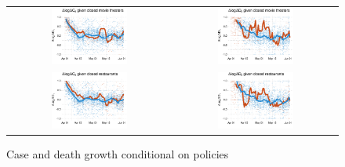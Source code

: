 \documentclass[11pt,reqno,letter]{amsart}
\theoremstyle{definition}
\begin{document}
\begin{figure}
  \caption{Case and death growth conditional on policies \label{fig:growthpolicies2}}
  \begin{minipage}{\linewidth}
    \centering
    \begin{tabular}{cc}
      \includegraphics[width=0.483\textwidth]{tables_and_figures/pmovie-cases-14}
      &
        \includegraphics[width=0.483\textwidth]{tables_and_figures/pmovie-deaths-21}
      \\
      \includegraphics[width=0.483\textwidth]{tables_and_figures/prestaurant-cases-14}
      &
        \includegraphics[width=0.483\textwidth]{tables_and_figures/prestaurant-deaths-21}

\end{tabular}
\end{minipage}
\end{figure}
\end{document}
